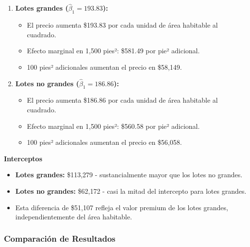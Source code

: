 \documentclass[12pt]{article}
\begin{document}
\begin{enumerate}
    \item \textbf{Lotes grandes ($\hat{\beta}_1 = 193.83$):}
    \begin{itemize}
        \item El precio aumenta \$193.83 por cada unidad de área habitable al cuadrado.
        \item Efecto marginal en 1,500 pies²: \$581.49 por pie² adicional.
        \item 100 pies² adicionales aumentan el precio en \$58,149.
    \end{itemize}
    
    \item \textbf{Lotes no grandes ($\hat{\beta}_1 = 186.86$):}
    \begin{itemize}
        \item El precio aumenta \$186.86 por cada unidad de área habitable al cuadrado.
        \item Efecto marginal en 1,500 pies²: \$560.58 por pie² adicional.
        \item 100 pies² adicionales aumentan el precio en \$56,058.
    \end{itemize}
\end{enumerate}

\textbf{Interceptos}

\begin{itemize}
    \item \textbf{Lotes grandes:} \$113,279 - sustancialmente mayor que los lotes no grandes.
    \item \textbf{Lotes no grandes:} \$62,172 - casi la mitad del intercepto para lotes grandes.
    \item Esta diferencia de \$51,107 refleja el valor premium de los lotes grandes, independientemente del área habitable.
\end{itemize}

\subsubsection*{Comparación de Resultados}
\end{document}

